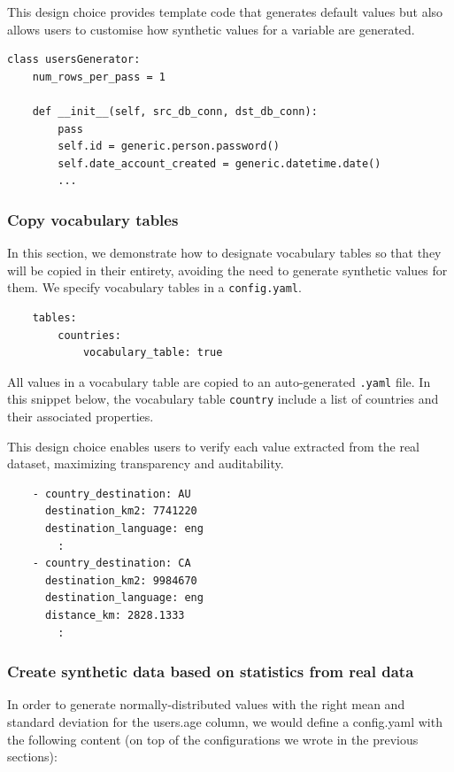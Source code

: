 \documentclass[11pt]{article}
\begin{document}
This design choice provides template code that generates default values but also allows users to customise how synthetic values for a variable are generated.

\begin{verbatim}
class usersGenerator:
    num_rows_per_pass = 1

    def __init__(self, src_db_conn, dst_db_conn):
        pass
        self.id = generic.person.password()
        self.date_account_created = generic.datetime.date()
        ...
\end{verbatim}

\subsubsection{Copy vocabulary tables}

In this section, we demonstrate how to designate vocabulary tables so that they will be copied in their entirety, avoiding the need to generate synthetic values for them. We specify vocabulary tables in a \texttt{config.yaml}. 

\begin{verbatim}
    tables:
        countries:
            vocabulary_table: true
\end{verbatim}

All values in a vocabulary table are copied to an auto-generated \texttt{.yaml} file. In this snippet below, the vocabulary table \texttt{country} include a list of countries and their associated properties. 

This design choice enables users to verify each value extracted from the real dataset, maximizing transparency and auditability.

\begin{verbatim}
    - country_destination: AU
      destination_km2: 7741220
      destination_language: eng
        :
    - country_destination: CA
      destination_km2: 9984670
      destination_language: eng
      distance_km: 2828.1333
        :
\end{verbatim}

\subsubsection{Create synthetic data based on statistics from real data}

In order to generate normally-distributed values with the right mean and standard deviation for the users.age column, we would define a config.yaml with the following content (on top of the configurations we wrote in the previous sections):
\end{document}
